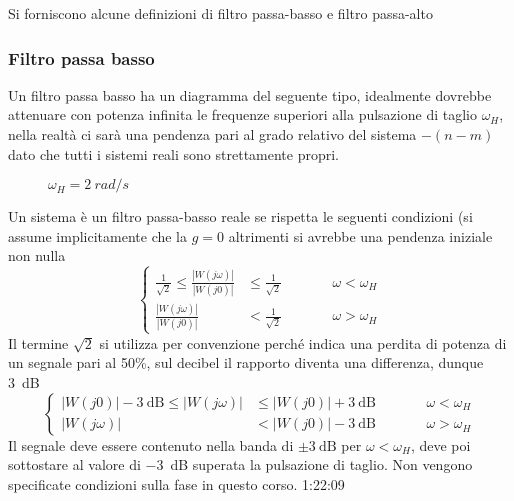 Si forniscono alcune definizioni di filtro passa-basso e filtro passa-alto

\newpage
\subsubsection{Filtro passa basso}
Un filtro passa basso ha un diagramma del seguente tipo, idealmente dovrebbe
attenuare con potenza infinita le frequenze superiori alla
pulsazione di taglio $\omega_H$, nella realtà ci sarà una pendenza pari al
grado relativo del sistema $-(n-m)$ dato che tutti i sistemi reali sono
strettamente propri.
\begin{figure}[h]
\centering
{}
\caption{$\omega_H = \SI{2}{rad/s}$}
\end{figure}

Un sistema è un filtro passa-basso reale se rispetta le seguenti condizioni (si
assume implicitamente che la $g=0$ altrimenti si avrebbe una pendenza iniziale
non nulla
$$
\left\{
\begin{aligned}
 \frac{1}{\sqrt{2}} \leq \frac{|W(j\omega)|}{|W(j0)|} &\leq \frac{1}{\sqrt{2}}
& &\qquad \omega<\omega_H \\
\frac{|W(j\omega)|}{|W(j0)|} &< \frac{1}{\sqrt{2}} & &\qquad \omega> \omega_H
\end{aligned}
\right.
$$
Il termine $\sqrt{2}$ si utilizza per convenzione perché indica una perdita di
potenza di un segnale pari al 50\%, sul decibel il rapporto diventa una
differenza, dunque \SI{3}{\deci\bel}
$$
\left\{
\begin{aligned}
|W(j0)| - \SI{3}{\deci\bel} \leq |W(j\omega)| &\leq |W(j0)| + \SI{3}{\deci\bel}
 & &\qquad \omega < \omega_H \\
 |W(j\omega)| &<  |W(j0)| - \SI{3}{\deci\bel} &  &\qquad \omega > \omega_H
\end{aligned}
\right.
$$
Il segnale deve essere contenuto nella banda di $\pm\SI{3}{\deci\bel}$ per
$\omega<\omega_H$, deve poi sottostare al valore di \SI{-3}{\deci\bel} superata
la pulsazione di taglio. Non vengono specificate condizioni sulla fase in
questo corso.
1:22:09
